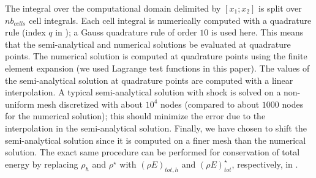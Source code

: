 \documentclass[times,doublespace]{fldauth}%
\begin{document}
The integral over the computational domain delimited by $[x_1; x_2]$ is split over $nb_{cells}$ cell integrals. Each cell integral is numerically computed with a quadrature rule (index $q$ in ); a Gauss quadrature rule of order $10$ is used here. This means that the semi-analytical and numerical solutions be evaluated at quadrature points. The numerical solution is computed at quadrature points using the finite element expansion (we used Lagrange test functions in this paper). The values of the semi-analytical solution at quadrature points are computed with a linear interpolation.
A typical semi-analytical solution with shock is solved on a non-uniform mesh discretized with about $10^4$ nodes (compared to about $1000$ nodes for the numerical solution); this should minimize the error due to the interpolation in the semi-analytical solution. Finally, we have chosen to shift the semi-analytical solution since it is computed on a finer mesh than the numerical solution. The exact same procedure can be performed for conservation of total energy by replacing $\rho_h$ and $\rho^\star$ with $(\rho E)_{tot,h}$ and $(\rho E)^\star_{tot}$, respectively, in . 
\end{document}
